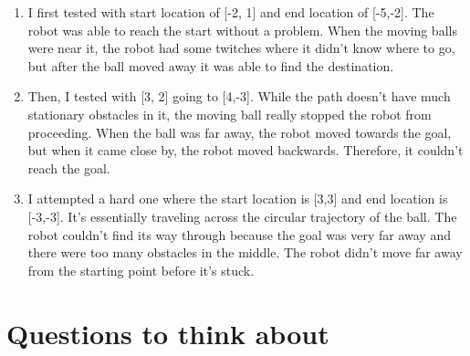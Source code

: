 \documentclass{article}
\begin{document}
\begin{enumerate}
    

    \item I first tested with start location of [-2, 1] and end location of [-5,-2].  The robot was able to reach the start without a problem. When the moving balls were near it, the robot had some twitches where it didn't know where to go, but after the ball moved away it was able to find the destination.

    \item Then, I tested with [3, 2] going to [4,-3]. While the path doesn't have much stationary obstacles in it, the moving ball really stopped the robot from proceeding. When the ball was far away, the robot moved towards the goal, but when it came close by, the robot moved backwards. Therefore, it couldn't reach the goal.
    
    \item I attempted a hard one where the start location is [3,3] and end location is [-3,-3]. It's essentially traveling across the circular trajectory of the ball. The robot couldn't find its way through because the goal was very far away and there were too many obstacles in the middle. The robot didn't move far away from the starting point before it's stuck. 


\end{enumerate}

\section{Questions to think about}
\end{document}
